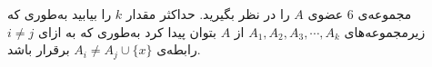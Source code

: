 \EXERCISE
مجموعه‌ی
$6$
عضوی
$A$
را در نظر بگیرید. حداکثر مقدار
$k$
را بیابید به‌طوری که زیرمجموعه‌های
$A_1, A_2, A_3, \cdots, A_k$
از
$A$
بتوان پیدا کرد به‌طوری که به ازای
$i \neq j$
رابطه‌ی
$A_i \neq A_j \cup \{x\}$
برقرار باشد.